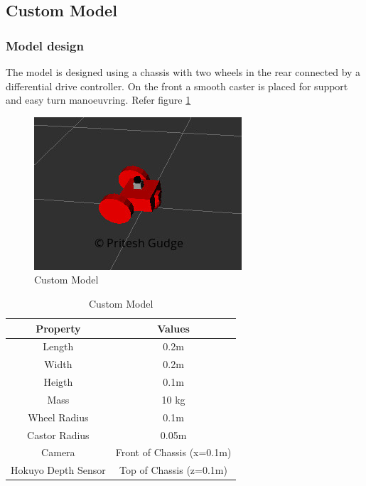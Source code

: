 \documentclass[10pt,journal,compsoc]{IEEEtran}
\begin{document}
\subsection{Custom Model}
\subsubsection{Model design}
The model is designed using a chassis with two wheels in the rear connected by a differential drive controller. On the front a smooth caster is placed for support and easy turn manoeuvring. Refer figure \ref{fig:custommodel}

\begin{figure}[thpb]
      \centering
      \includegraphics[width=\linewidth]{images/custom_obj}
      \caption{Custom Model}
      \label{fig:custommodel}
\end{figure}

\begin{table}[h]
\caption{ Custom Model}
\label{custommodeltable}
\begin{center}
\begin{tabular}{|c|c|}
\hline
Property & Values\\
\hline
Length & 0.2m \\
\hline
Width & 0.2m \\
\hline
Heigth & 0.1m \\
\hline
Mass & 10 kg \\
\hline
Wheel Radius & 0.1m \\
\hline
Castor Radius & 0.05m \\
\hline
Camera & Front of Chassis (x=0.1m) \\
\hline
Hokuyo Depth Sensor & Top of Chassis (z=0.1m) \\
\hline
\end{tabular}
\end{center}
\end{table}
\end{document}
